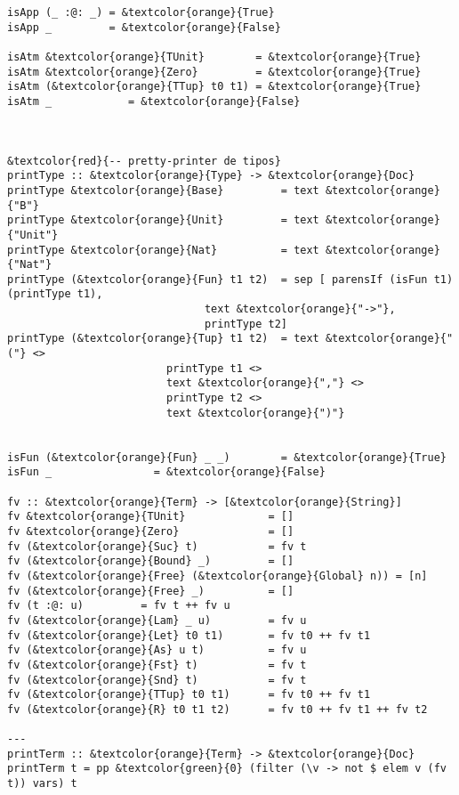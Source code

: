 \documentclass[12pt, a4paper]{article}
\begin{document}
\begin{Verbatim}[commandchars=\&\{\}]
isApp (_ :@: _) = &textcolor{orange}{True}
isApp _         = &textcolor{orange}{False}

isAtm &textcolor{orange}{TUnit}        = &textcolor{orange}{True}
isAtm &textcolor{orange}{Zero}         = &textcolor{orange}{True}
isAtm (&textcolor{orange}{TTup} t0 t1) = &textcolor{orange}{True}
isAtm _            = &textcolor{orange}{False}



&textcolor{red}{-- pretty-printer de tipos}
printType :: &textcolor{orange}{Type} -> &textcolor{orange}{Doc}
printType &textcolor{orange}{Base}         = text &textcolor{orange}{"B"}
printType &textcolor{orange}{Unit}         = text &textcolor{orange}{"Unit"}
printType &textcolor{orange}{Nat}          = text &textcolor{orange}{"Nat"}
printType (&textcolor{orange}{Fun} t1 t2)  = sep [ parensIf (isFun t1) (printType t1), 
                               text &textcolor{orange}{"->"}, 
                               printType t2]
printType (&textcolor{orange}{Tup} t1 t2)  = text &textcolor{orange}{"("} <>
                         printType t1 <>
                         text &textcolor{orange}{","} <>
                         printType t2 <>
                         text &textcolor{orange}{")"}


isFun (&textcolor{orange}{Fun} _ _)        = &textcolor{orange}{True}
isFun _                = &textcolor{orange}{False}

fv :: &textcolor{orange}{Term} -> [&textcolor{orange}{String}]
fv &textcolor{orange}{TUnit}             = []
fv &textcolor{orange}{Zero}              = []
fv (&textcolor{orange}{Suc} t)           = fv t
fv (&textcolor{orange}{Bound} _)         = []
fv (&textcolor{orange}{Free} (&textcolor{orange}{Global} n)) = [n]
fv (&textcolor{orange}{Free} _)          = []
fv (t :@: u)         = fv t ++ fv u
fv (&textcolor{orange}{Lam} _ u)         = fv u
fv (&textcolor{orange}{Let} t0 t1)       = fv t0 ++ fv t1
fv (&textcolor{orange}{As} u t)          = fv u
fv (&textcolor{orange}{Fst} t)           = fv t
fv (&textcolor{orange}{Snd} t)           = fv t
fv (&textcolor{orange}{TTup} t0 t1)      = fv t0 ++ fv t1
fv (&textcolor{orange}{R} t0 t1 t2)      = fv t0 ++ fv t1 ++ fv t2
  
---
printTerm :: &textcolor{orange}{Term} -> &textcolor{orange}{Doc} 
printTerm t = pp &textcolor{green}{0} (filter (\v -> not $ elem v (fv t)) vars) t
\end{Verbatim}
\newpage
\end{document}
